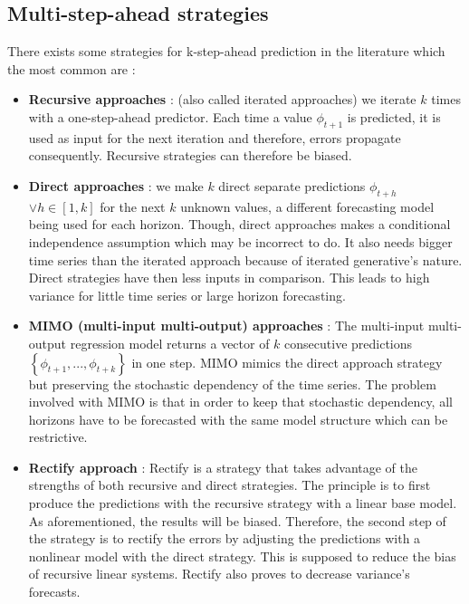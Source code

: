 \documentclass[11pt,a4paper,oneside]{book}
\begin{document}
\subsection{Multi-step-ahead strategies}

There exists some strategies for k-step-ahead prediction in the literature which the most common are \cite{Bonte}\cite{taiebonte}:

\begin{itemize}
    \item \textbf{Recursive approaches} : (also called iterated approaches) we iterate $k$ times with a one-step-ahead predictor. Each time a value $\phi_{t+1}$ is predicted, it is used as input for the next iteration and therefore, errors propagate consequently. Recursive strategies can therefore be biased.
    \item \textbf{Direct approaches} : we make $k$ direct separate predictions $\phi_{t+h}$ $\vee h \in \left[1, k\right]$ for the next $k$ unknown values, a different forecasting model being used for each horizon. Though, direct approaches makes a conditional independence assumption which may be incorrect to do. It also needs bigger time series than the iterated approach because of iterated generative's nature. Direct strategies have then less inputs in comparison. This leads to high variance for little time series or large horizon forecasting.
    \item \textbf{MIMO (multi-input multi-output) approaches} : The multi-input multi-output regression model returns a vector of $k$ consecutive predictions $\left\{\phi_{t+1},...,\phi_{t+k}\right\}$ in one step. MIMO mimics the direct approach strategy but preserving the stochastic dependency of the time series. The problem involved with MIMO is that in order to keep that stochastic dependency, all horizons have to be forecasted with the same model structure which can be restrictive. \cite{Bonte}\cite{taiebonte}
    \item \textbf{Rectify approach} : Rectify is a strategy that takes advantage of the strengths of both recursive and direct strategies. The principle is to first produce the predictions with the recursive strategy with a linear base model. As aforementioned, the results will be biased. Therefore, the second step of the strategy is to rectify the errors by adjusting the predictions with a nonlinear model with the direct strategy. This is supposed to reduce the bias of recursive linear systems. Rectify also proves to decrease variance's forecasts. \cite{BenTaieb}
\end{itemize}
\end{document}
